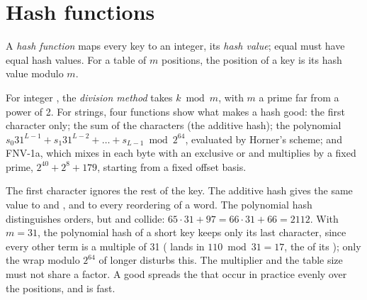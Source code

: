 \section{Hash functions}\label{sec:b1:hash-tables:functions}

\begin{definition}\label{def:b1:hash-tables:hash-function}
A \emph{hash function} maps every key to an integer, its \emph{hash value}; equal
 must have equal hash values. For a table of $m$ positions, the position of a key is its hash value modulo $m$.
\end{definition}

For integer , the \emph{division method} takes $k \bmod m$, with $m$ a prime far from a power of 2. For strings,
four functions show what makes a hash good: the first character only; the sum of the characters (the additive hash);
the polynomial $s_0 31^{L-1} + s_1 31^{L-2} + \dots + s_{L-1} \bmod 2^{64}$, evaluated by Horner's scheme; and FNV-1a,
which mixes in each byte with an exclusive or and multiplies by a fixed prime, $2^{40} + 2^8 + 179$, starting from a fixed
offset basis.

\label{lst:b1:hash-tables:hashes}

\label{out:b1:hash-tables:funcs}

The first character ignores the rest of the key. The additive hash gives the same value to  and
, and to every reordering of a word. The polynomial hash distinguishes orders, but  and 
collide: $65 \cdot 31 + 97 = 66 \cdot 31 + 66 = 2112$. With $m = 31$, the polynomial hash of a short key keeps only its
last character, since every other term is a multiple of 31 ( lands in  $110 \bmod 31 = 17$, the 
of its ); only the wrap modulo $2^{64}$ of longer  disturbs this. The multiplier and the table size must not
share a factor. A good  spreads the  that occur in practice evenly over the positions, and is fast.

